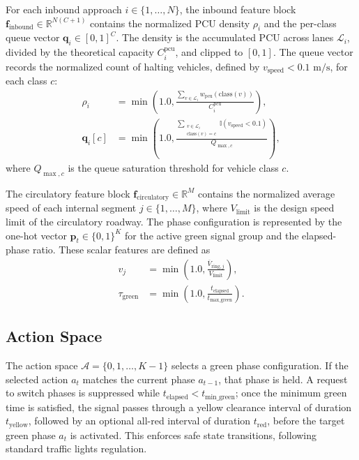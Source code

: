For each inbound approach $i \in \{1,\dots,N\}$, the inbound feature block $\mathbf{f}_{\text{inbound}} \in \mathbb{R}^{N(C+1)}$ contains the normalized PCU density $\rho_i$ and the per-class queue vector $\mathbf{q}_i \in [0,1]^C$. The density is the accumulated PCU across lanes $\mathcal{L}_i$, divided by the theoretical capacity $C_i^{\text{pcu}}$, and clipped to $[0,1]$. The queue vector records the normalized count of halting vehicles, defined by $v_{\text{speed}}<0.1\text{ m/s}$, for each class $c$:
\begin{align*}
\rho_i &= \min\left(1.0,\frac{\sum_{v \in \mathcal{L}_i} w_{\text{pcu}}(\text{class}(v))}{C_i^{\text{pcu}}}\right),\\
\mathbf{q}_i[c] &= \min\left(1.0,\frac{\sum_{\substack{v \in \mathcal{L}_i\\ \text{class}(v)=c}} \mathbb{I}(v_{\text{speed}}<0.1)}{Q_{\max,c}}\right),
\end{align*}
where $Q_{\max,c}$ is the queue saturation threshold for vehicle class $c$.

The circulatory feature block $\mathbf{f}_{\text{circulatory}} \in \mathbb{R}^M$ contains the normalized average speed of each internal segment $j \in \{1,\dots,M\}$, where $V_{\text{limit}}$ is the design speed limit of the circulatory roadway. The phase configuration is represented by the one-hot vector $\mathbf{p}_t \in \{0,1\}^K$ for the active green signal group and the elapsed-phase ratio. These scalar features are defined as
\begin{align*}
v_j &= \min\left(1.0,\frac{\overline{V}_{\text{ring},j}}{V_{\text{limit}}}\right),\\
\tau_{\text{green}} &= \min\left(1.0,\frac{t_{\text{elapsed}}}{t_{\text{max\_green}}}\right).
\end{align*}

\subsection{Action Space}
The action space $\mathcal{A}=\{0,1,\dots,K-1\}$ selects a green phase configuration. If the selected action $a_t$ matches the current phase $a_{t-1}$, that phase is held. A request to switch phases is suppressed while $t_{\text{elapsed}}<t_{\text{min\_green}}$; once the minimum green time is satisfied, the signal passes through a yellow clearance interval of duration $t_{\text{yellow}}$, followed by an optional all-red interval of duration $t_{\text{red}}$, before the target green phase $a_t$ is activated. This enforces safe state transitions, following standard traffic lights regulation.

